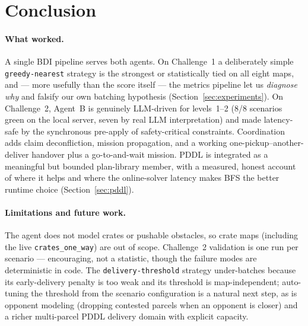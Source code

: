 \section{Conclusion}

\paragraph{What worked.} A single BDI pipeline serves both agents. On
Challenge~1 a deliberately simple \texttt{greedy-nearest} strategy is the
strongest or statistically tied on all eight maps, and --- more usefully than
the score itself --- the metrics pipeline let us \emph{diagnose why} and falsify
our own batching hypothesis (Section~\ref{sec:experiments}). On Challenge~2,
Agent~B is genuinely LLM-driven for levels~1--2 (8/8 scenarios green on the
local server, seven by real LLM interpretation) and made latency-safe by the
synchronous pre-apply of safety-critical constraints. Coordination adds claim
deconfliction, mission propagation, and a working one-pickup--another-deliver
handover plus a go-to-and-wait mission. PDDL is integrated as a meaningful but
bounded plan-library member, with a measured, honest account of where it helps
and where the online-solver latency makes BFS the better runtime choice
(Section~\ref{sec:pddl}).

\paragraph{Limitations and future work.} The agent does not model crates or
pushable obstacles, so crate maps (including the live \texttt{crates\_one\_way})
are out of scope. Challenge~2 validation is one run per scenario --- encouraging,
not a statistic, though the failure modes are deterministic in code. The
\texttt{delivery-threshold} strategy under-batches because its early-delivery
penalty is too weak and its threshold is map-independent; auto-tuning the
threshold from the scenario configuration is a natural next step, as is opponent
modeling (dropping contested parcels when an opponent is closer) and a richer
multi-parcel PDDL delivery domain with explicit capacity.

